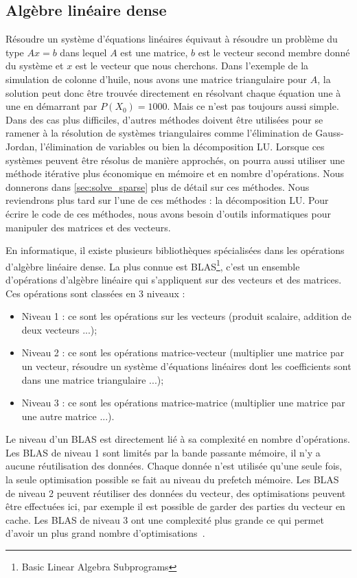 \subsection{Algèbre linéaire dense}
Résoudre un système d'équations linéaires équivaut à résoudre un problème du type $Ax=b$ dans lequel $A$ est une matrice, $b$ est le vecteur second membre donné du système et $x$ est le vecteur que nous cherchons.
%
Dans l'exemple de la simulation de colonne d'huile, nous avons une matrice triangulaire pour $A$, la solution peut donc être trouvée directement en résolvant chaque équation une à une en démarrant par $P(X_0) = 1000$.
%
Mais ce n'est pas toujours aussi simple.
%
Dans des cas plus difficiles, d'autres méthodes doivent être utilisées pour se ramener à la résolution de systèmes triangulaires comme l'élimination de Gauss-Jordan, l'élimination de variables ou bien la décomposition LU.
%
Lorsque ces systèmes peuvent être résolus de manière approchés, on pourra aussi utiliser une méthode itérative plus économique en mémoire et en nombre d'opérations.
%
Nous donnerons dans \ref{sec:solve_sparse} plus de détail sur ces méthodes.
%
Nous reviendrons plus tard sur l'une de ces méthodes : la décomposition LU.
%
Pour écrire le code de ces méthodes, nous avons besoin d'outils informatiques pour manipuler des matrices et des vecteurs.


En informatique, il existe plusieurs bibliothèques spécialisées dans les opérations d'algèbre linéaire dense.
%
La plus connue est BLAS\footnote{Basic Linear Algebra Subprograms}, c'est un ensemble d'opérations d'algèbre linéaire qui s'appliquent sur des vecteurs et des matrices.
%
Ces opérations sont classées en 3 niveaux :
\begin{itemize}
  \item Niveau 1 : ce sont les opérations sur les vecteurs (produit scalaire, addition de deux vecteurs ...);
  \item Niveau 2 : ce sont les opérations matrice-vecteur (multiplier une matrice par un vecteur, résoudre un système d'équations linéaires dont les coefficients sont dans une matrice triangulaire ...);
  \item Niveau 3 : ce sont les opérations matrice-matrice (multiplier une matrice par une autre matrice ...).
\end{itemize}
%
Le niveau d'un BLAS est directement lié à sa complexité en nombre d'opérations.
%
Les BLAS de niveau 1 sont limités par la bande passante mémoire, il n'y a aucune réutilisation des données.
%
Chaque donnée n'est utilisée qu'une seule fois, la seule optimisation possible se fait au niveau du prefetch mémoire.
%
Les BLAS de niveau 2 peuvent réutiliser des données du vecteur, des optimisations peuvent être effectuées ici, par exemple il est possible de garder des parties du vecteur en cache.
%
Les BLAS de niveau 3 ont une complexité plus grande ce qui permet d'avoir un plus grand nombre d'optimisations~\cite{blas3_opt}.


